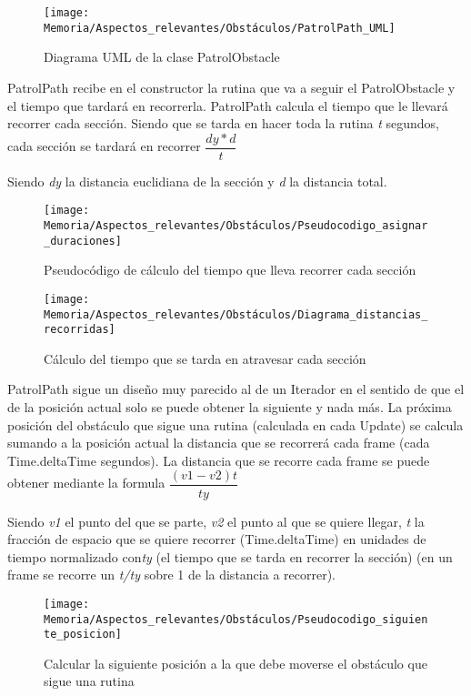 \begin{figure}[h]
\centering
\texttt{[image: Memoria/Aspectos\_relevantes/Obstáculos/PatrolPath\_UML]}
\caption{Diagrama UML de la clase PatrolObstacle}
\end{figure}

PatrolPath recibe en el constructor la rutina que va a seguir el PatrolObstacle y el tiempo que tardará en recorrerla. PatrolPath calcula el tiempo que le llevará recorrer cada sección. Siendo que se tarda en hacer toda la rutina \textit{t} segundos, cada sección se tardará en recorrer $\dfrac{dy*d}{t}$

Siendo \textit{dy} la distancia euclidiana de la sección y \textit{d} la distancia total.

\begin{figure}[h]
\centering
\texttt{[image: Memoria/Aspectos\_relevantes/Obstáculos/Pseudocodigo\_asignar\_duraciones]}
\caption{Pseudocódigo de cálculo del tiempo que lleva recorrer cada sección}
\end{figure}

\clearpage
\begin{figure}[h]
\centering
\texttt{[image: Memoria/Aspectos\_relevantes/Obstáculos/Diagrama\_distancias\_recorridas]}
\caption{Cálculo del tiempo que se tarda en atravesar cada sección}
\end{figure}

PatrolPath sigue un diseño muy parecido al de un Iterador en el sentido de que el de la posición actual solo se puede obtener la siguiente y nada más.
La próxima posición del obstáculo que sigue una rutina (calculada en cada Update) se calcula sumando a la posición actual la distancia que se recorrerá cada frame (cada Time.deltaTime segundos).
La distancia que se recorre cada frame se puede obtener mediante la formula $\dfrac{(v1-v2)t}{ty}$

Siendo \textit{v1} el punto del que se parte, \textit{v2} el punto al que se quiere llegar, \textit{t} la fracción de espacio que se quiere recorrer (Time.deltaTime) en unidades de tiempo normalizado con\textit{ty} (el tiempo que se tarda en recorrer la sección) (en un frame se recorre un \textit{t/ty} sobre 1 de la distancia a recorrer).

\clearpage
\begin{figure}[h]
\centering
\texttt{[image: Memoria/Aspectos\_relevantes/Obstáculos/Pseudocodigo\_siguiente\_posicion]}
\caption{Calcular la siguiente posición a la que debe moverse el obstáculo que sigue una rutina}
\end{figure}

